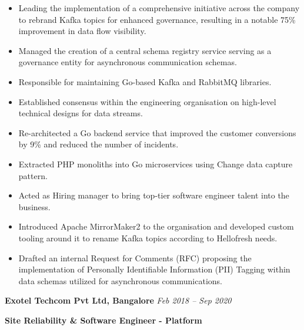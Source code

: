 \documentclass[11pt, oneside]{article}
\begin{document}
\begin{itemize}
  \item Leading the implementation of a comprehensive initiative across the company to rebrand Kafka topics for enhanced governance, resulting in a notable 75\% improvement in data flow visibility.
  \item Managed the creation of a central schema registry service serving as a governance entity for asynchronous communication schemas. 
  \item Responsible for maintaining Go-based Kafka and RabbitMQ libraries. 
  \item Established consensus within the engineering organisation on high-level technical designs for data streams.
  \item Re-architected a Go backend service that improved the customer conversions by 9\% and reduced the number of incidents.
  \item Extracted PHP monoliths into Go microservices using Change data capture pattern.
  \item Acted as Hiring manager to bring top-tier software engineer talent into the business. 
  \item Introduced Apache MirrorMaker2 to the organisation and developed custom tooling around it to rename Kafka topics according to Hellofresh needs.
  \item Drafted an internal Request for Comments (RFC) proposing the implementation of Personally Identifiable Information (PII) Tagging within data schemas utilized for asynchronous communications.

\end{itemize}

\medskip

\textbf{Exotel Techcom Pvt Ltd, Bangalore}
\hfill
\textit{Feb 2018 – Sep 2020}

\textbf{Site Reliability \& Software Engineer - Platform}
\end{document}
